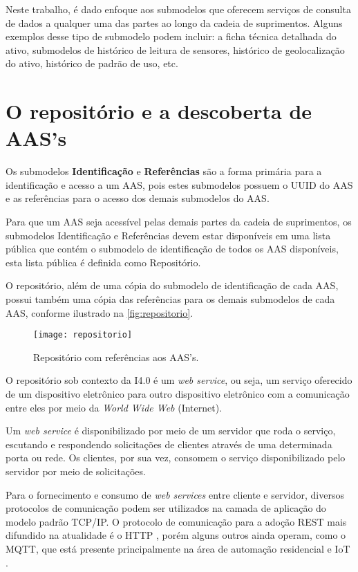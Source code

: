	Neste trabalho, é dado enfoque aos submodelos que oferecem serviços de consulta de dados a qualquer uma das partes ao longo da cadeia de suprimentos. Alguns exemplos desse tipo de submodelo podem incluir: a ficha técnica detalhada do ativo, submodelos de histórico de leitura de sensores, histórico de geolocalização do ativo, histórico de padrão de uso, etc.		

	
\section{O repositório e a descoberta de AAS's}
	
	Os submodelos \textbf{Identificação} e \textbf{Referências} são a forma primária para a identificação e acesso a um AAS, pois estes submodelos possuem o UUID do AAS e as referências para o acesso dos demais submodelos do AAS.
	
	Para que um AAS seja acessível pelas demais partes da cadeia de suprimentos, os submodelos Identificação e Referências devem estar disponíveis em uma lista pública que contém o submodelo de identificação de todos os AAS disponíveis, esta lista pública é definida como Repositório.
	
	O repositório, além de uma cópia do submodelo de identificação de cada AAS, possui também uma cópia das referências para os demais submodelos de cada AAS, conforme ilustrado na \autoref{fig:repositorio}.

	\begin{figure}[htb]
		\centering
		\caption{Repositório com referências aos AAS's.}
		\label{fig:repositorio}
		\texttt{[image: repositorio]}
	\end{figure}
	
	O repositório sob contexto da I4.0 é um \textit{web service}, ou seja, um serviço oferecido de um dispositivo eletrônico para outro dispositivo eletrônico com a comunicação entre eles por meio da \textit{World Wide Web} (Internet).
	
	Um \textit{web service} é disponibilizado por meio de um servidor que roda o serviço, escutando e respondendo solicitações de clientes através de uma determinada porta ou rede. Os clientes, por sua vez, consomem o serviço disponibilizado pelo servidor por meio de solicitações.
	
	Para o fornecimento e consumo de \textit{web services} entre cliente e servidor, diversos protocolos de comunicação podem ser utilizados na camada de aplicação do modelo padrão TCP/IP. O protocolo de comunicação para a adoção REST mais difundido na atualidade é o HTTP \cite{gruner2016restful}, porém alguns outros ainda operam, como o MQTT, que está presente principalmente na área de automação residencial e IoT \cite{yokotani2016mqtt}.
	
